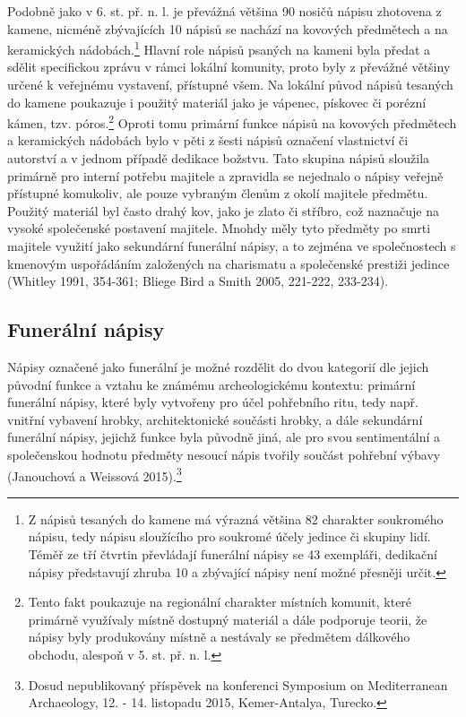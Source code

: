 Podobně jako v 6. st. př. n. l. je převážná většina 90  nosičů nápisu zhotovena z kamene, nicméně zbývajících 10  nápisů se nachází na kovových předmětech a na keramických nádobách.\footnote{Z nápisů tesaných do kamene má výrazná většina 82  charakter soukromého nápisu, tedy nápisu sloužícího pro soukromé účely jedince či skupiny lidí. Téměř ze tří čtvrtin převládají funerální nápisy se 43 exempláři, dedikační nápisy představují zhruba 10  a zbývající nápisy není možné přesněji určit.} Hlavní role nápisů psaných na kameni byla předat a sdělit specifickou zprávu v rámci lokální komunity, proto byly z převážné většiny určené k veřejnému vystavení, přístupné všem. Na lokální původ nápisů tesaných do kamene poukazuje i použitý materiál jako je vápenec, pískovec či porézní kámen, tzv. póros.\footnote{Tento fakt poukazuje na regionální charakter místních komunit, které primárně využívaly místně dostupný materiál a dále podporuje teorii, že nápisy byly produkovány místně a nestávaly se předmětem dálkového obchodu, alespoň v 5. st. př. n. l.} Oproti tomu primární funkce nápisů na kovových předmětech a keramických nádobách bylo v pěti z šesti nápisů označení vlastnictví či autorství a v jednom případě dedikace božstvu. Tato skupina nápisů sloužila primárně pro interní potřebu majitele a zpravidla se nejednalo o nápisy veřejně přístupné komukoliv, ale pouze vybraným členům z okolí majitele předmětu. Použitý materiál byl často drahý kov, jako je zlato či stříbro, což naznačuje na vysoké společenské postavení majitele. Mnohdy měly tyto předměty po smrti majitele využití jako sekundární funerální nápisy, a to zejména ve společnostech s kmenovým uspořádáním založených na charismatu a společenské prestiži jedince (Whitley 1991, 354-361; Bliege Bird a Smith 2005, 221-222, 233-234).

\subsection[funerální-nápisy-1]{Funerální nápisy}

Nápisy označené jako funerální je možné rozdělit do dvou kategorií dle jejich původní funkce a vztahu ke známému archeologickému kontextu: primární funerální nápisy, které byly vytvořeny pro účel pohřebního ritu, tedy např. vnitřní vybavení hrobky, architektonické součásti hrobky, a dále sekundární funerální nápisy, jejichž funkce byla původně jiná, ale pro svou sentimentální a společenskou hodnotu předměty nesoucí nápis tvořily součást pohřební výbavy (Janouchová a Weissová 2015).\footnote{Dosud nepublikovaný příspěvek na konferenci Symposium on Mediterranean Archaeology, 12. - 14. listopadu 2015, Kemer-Antalya, Turecko.}

